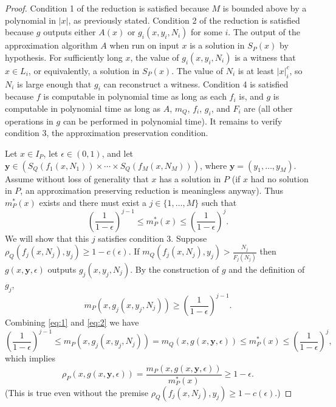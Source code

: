 \documentclass{article}
\begin{document}
\begin{proof}
  Condition 1 of the reduction is satisfied because $M$ is bounded above by a polynomial in $|x|$, as previously stated.
  Condition 2 of the reduction is satisfied because $g$ outputs either $A(x)$ or $g_i(x, y_i, N_i)$ for some $i$.
  The output of the approximation algorithm $A$ when run on input $x$ is a solution in $S_P(x)$ by hypothesis.
  For sufficiently long $x$, the value of $g_i(x, y_i, N_i)$ is a witness that $x \in L_i$, or equivalently, a solution in $S_P(x)$.
  The value of $N_i$ is at least $|x|^c_i$, so $N_i$ is large enough that $g_i$ can reconstruct a witness.
  Condition 4 is satisfied because $f$ is computable in polynomial time as long as each $f_i$ is, and $g$ is computable in polynomial time as long as $A$, $m_Q$, $f_i$, $g_i$, and $F_i$ are (all other operations in $g$ can be performed in polynomial time).
  It remains to verify condition 3, the approximation preservation condition.

  Let $x \in I_P$, let $\epsilon \in (0, 1)$, and let $\mathbf{y} \in (S_Q(f_1(x, N_1)) \times \dotsb \times S_Q(f_M(x, N_M)))$, where $\mathbf{y} = (y_1, \dotsc, y_M)$.
  Assume without loss of generality that $x$ has a solution in $P$ (if $x$ had no solution in $P$, an approximation preserving reduction is meaningless anyway).
  Thus $m_P^*(x)$ exists and there must exist a $j \in \{1, \dotsc, M\}$ such that
  \begin{equation}\label{eq:1}
    \left(\frac{1}{1 - \epsilon}\right)^{j - 1} \leq m_P^*(x) \leq \left(\frac{1}{1 - \epsilon}\right)^j.
  \end{equation}
  We will show that this $j$ satisfies condition 3.
  Suppose $\rho_Q(f_j(x, N_j), y_j) \geq 1 - c(\epsilon)$.
  If $m_Q(f_j(x, N_j), y_j) > \frac{N_j}{F_j(N_j)}$ then $g(x, \mathbf{y}, \epsilon)$ outputs $g_j(x, y_j, N_j)$.
  By the construction of $g$ and the definition of $g_j$,
  \begin{equation}\label{eq:2}
    m_P(x, g_j(x, y_j, N_j)) \geq \left(\frac{1}{1 - \epsilon}\right)^{j - 1}.
  \end{equation}
  Combining \autoref{eq:1} and \autoref{eq:2} we have
  \begin{equation*}
    \left(\frac{1}{1 - \epsilon}\right)^{j - 1} \leq m_P(x, g_j(x, y_j, N_j)) = m_Q(x, g(x, \mathbf{y}, \epsilon)) \leq m_P^*(x) \leq \left(\frac{1}{1 - \epsilon}\right)^j,
  \end{equation*}
  which implies
  \begin{equation*}
    \rho_P(x, g(x, \mathbf{y}, \epsilon)) = \frac{m_P(x, g(x, \mathbf{y}, \epsilon))}{m_P^*(x)} \geq 1 - \epsilon.
  \end{equation*}
  (This is true even without the premise $\rho_Q(f_j(x, N_j), y_j) \geq 1 - c(\epsilon)$.)


\end{proof}
\end{document}
